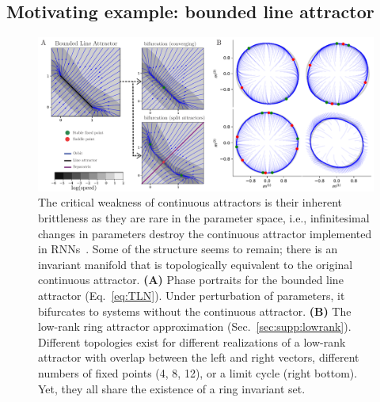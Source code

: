 \documentclass{article} %
\newcounter{ct}
\theoremstyle{definition}
\theoremstyle{remark}
\renewcommand{\cite}{\citep}
\begin{document}
\subsection{Motivating example: bounded line attractor}\label{sec:motivating:line}
\begin{figure}[tbhp]
  \centering
  \includegraphics[width=\textwidth]{lara_bifurcations_simple}
  \caption{The critical weakness of continuous attractors is their inherent brittleness as they are rare in the parameter space, i.e., infinitesimal changes in parameters destroy the continuous attractor implemented in RNNs~\cite{seung1996,Renart2003}.
  Some of the structure seems to remain; there is an invariant manifold that is topologically equivalent to the original continuous attractor.
    \textbf{(A)} Phase portraits for the bounded line attractor (Eq.~\eqref{eq:TLN}).
    Under perturbation of parameters, it bifurcates to systems without the continuous attractor.
    \textbf{(B)} The low-rank ring attractor approximation (Sec.~\eqref{sec:supp:lowrank}).
    Different topologies exist for different realizations of a low-rank attractor with overlap between the left and right vectors, different numbers of fixed points (4, 8, 12), or a limit cycle (right bottom).
    Yet, they all share the existence of a ring invariant set.
}\label{fig:lara_bifurcations}
\end{figure}
\end{document}
